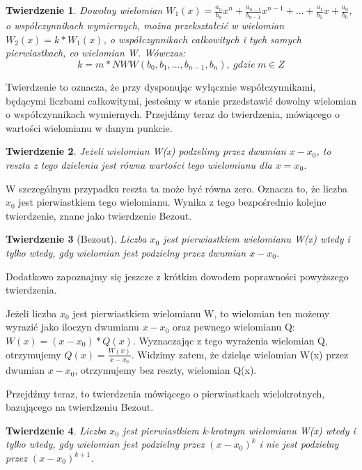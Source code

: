 \documentclass[twoside,a4paper]{book}
\newtheorem{theorem}{Twierdzenie}
\newenvironment{proof}[1][Dowód]{\begin{trivlist}
\item[\hskip \labelsep {\bfseries #1}]}{\end{trivlist}}
\begin{document}
\begin{theorem}
	Dowolny wielomian $W_1(x) = \frac{a_n}{b_n}x^n + \frac{a_{n-1}}{b_{n-1}}x^{n-1} + ... + \frac{a_1}{b_1}x + \frac{a_0}{b_0}$, o współczynnikach wymiernych, można przekształcić w wielomian $W_2(x) = k * W_1(x)$, o współczynnikach całkowitych i tych samych pierwiastkach, co wielomian W. Wówczas:
	\begin{equation}
	k = m * NWW(b_0, b_1, ..., b_{n-1}, b_n),\ gdzie\ m\in Z
	\end{equation}
\end{theorem}

Twierdzenie to oznacza, że przy dysponując wyłącznie współczynnikami, będącymi liczbami całkowitymi, jesteśmy w stanie przedstawić dowolny wielomian o współczynnikach wymiernych. Przejdźmy teraz do twierdzenia, mówiącego o wartości wielomianu w danym punkcie.

\begin{theorem}
	Jeżeli wielomian W(x) podzelimy przez dwumian $x - x_0$, to reszta z tego dzielenia jest równa wartości tego wielomianu dla $x = x_0$.
\end{theorem}

W szczególnym przypadku reszta ta może być równa zero. Oznacza to, że liczba $x_0$ jest pierwiastkiem tego wielomianu. Wynika z tego bezpośrednio kolejne twierdzenie, znane jako twierdzenie Bezout.

\begin{theorem}[Bezout]
	Liczba $x_0$ jest pierwiastkiem wielomianu W(x) wtedy i tylko wtedy, gdy wielomian jest podzielny przez dwumian $x - x_0$.
\end{theorem}

Dodatkowo zapoznajmy się jeszcze z krótkim dowodem poprawności powyższego twierdzenia.

\begin{proof}
	Jeżeli liczba $x_0$ jest pierwiastkiem wielomianu W, to wielomian ten możemy wyrazić jako iloczyn dwumianu $x - x_0$ oraz pewnego wielomianu Q: $W(x) = (x-x_0) * Q(x)$. Wyznaczając z tego wyrażenia wielomian Q, otrzymujemy $Q(x) = \frac{W(x)}{x-x_0}$. Widzimy zatem, że dzieląc wielomian W(x) przez dwumian $x-x_0$, otrzymujemy bez reszty, wielomian Q(x).
\end{proof}

Przejdźmy teraz, to twierdzenia mówiącego o pierwiastkach wielokrotnych, bazującego na twierdzeniu Bezout.

\begin{theorem}
	Liczba $x_0$ jest pierwiastkiem k-krotnym wielomianu W(x) wtedy i tylko wtedy, gdy wielomian jest podzielny przez $(x - x_0)^k$ i nie jest podzielny przez $(x - x_0)^{k+1}$.
\end{theorem}
\end{document}
